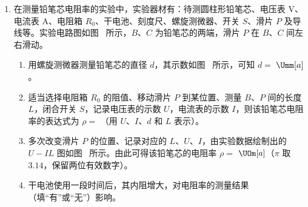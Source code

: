 \begin{enumerate}

\item
在测量铅笔芯电阻率的实验中，实验器材有：待测圆柱形铅笔芯、电压表 $ \mathrm{V} $、电流表 $ \mathrm{A} $、电阻箱 $ R_{0} $、干电池、刻度尺、螺旋测微器、开关 $ S $、滑片 $ P $ 及导线等。实验电路图如图~ 所示，$ B $、$ C $ 为铅笔芯的两端，滑片 $ P $ 在 $ B $、$ C $ 间左右滑动。
\begin{figure}[htbp]
\centering
\begin{subfigure}{0.48\linewidth}
	\centering
	
	\caption{}\label{2026湖北07}
\end{subfigure}
\hfil
\begin{subfigure}{0.33\linewidth}
	\centering
	
	\caption{}\label{2026湖北08}
\end{subfigure}
\end{figure}
\begin{enumerate}
\item
用螺旋测微器测量铅笔芯的直径 $d$，其示数如图~ 所示，可知 $d=$  $\Umm[a]$。
\item
适当选择电阻箱 $ R_{0} $ 的阻值、移动滑片 $ P $ 到某位置、测量 $ B $、$ P $ 间的长度 $ L $，闭合开关 $ S $，记录电压表的示数 $ U $，电流表的示数 $ I $，则该铅笔芯电阻率的表达式为 $ \rho = $ （用 $ U $、$ I $、$ d $ 和 $ L $ 表示）。
\item
多次改变滑片 $ P $ 的位置、记录对应的 $ L $、$ U $、$ I $，由实验数据绘制出的 $ U-IL $ 图如图~ 所示。由此可得该铅笔芯的电阻率 $ \rho = $  $ \UOm[a] $（$ \pi $ 取 $ 3.14 $，保留两位有效数字）。
\begin{figure}[htbp]
	\centering
	\begin{subfigure}{0.65\linewidth}
		\centering
		\setcounter{subfigure}{2}
		
		\caption{}\label{2026湖北09}
	\end{subfigure}
\end{figure}
\item
干电池使用一段时间后，其内阻增大，对电阻率的测量结果（填“有”或“无”）影响。	
\end{enumerate}



\end{enumerate}
